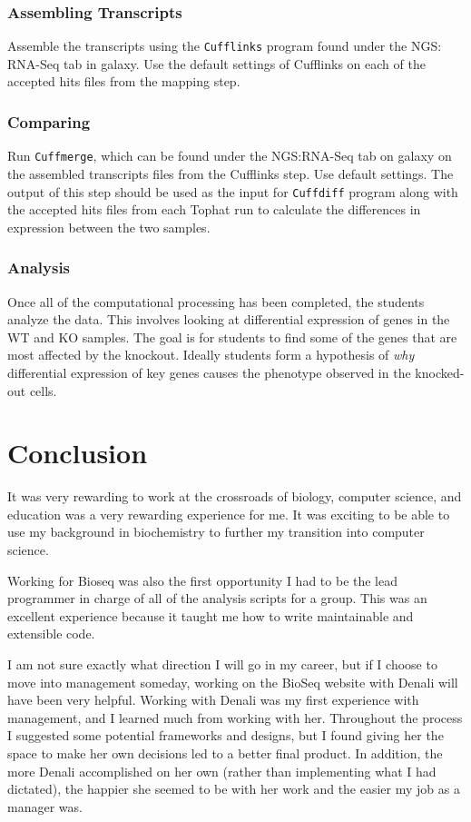 \documentclass{report}
\begin{document}
\subsection{Assembling Transcripts}
Assemble the transcripts using the \texttt{Cufflinks} program found under the NGS: RNA-Seq tab in galaxy. Use the default settings of Cufflinks on each of the accepted hits files from the mapping step.

\subsection{Comparing}
Run \texttt{Cuffmerge}, which can be found under the NGS:RNA-Seq tab on galaxy on the assembled transcripts files from the Cufflinks step. Use default settings. The output of this step should be used as the input for \texttt{Cuffdiff} program along with the accepted hits files from each Tophat run to calculate the differences in expression between the two samples. 

\subsection{Analysis}
Once all of the computational processing has been completed, the students analyze the data. This involves looking at differential expression of genes in the WT and KO samples. The goal is for students to find some of the genes that are most affected by the knockout. Ideally students form a hypothesis of \emph{why} differential expression of key genes causes the phenotype observed in the knocked-out cells.

\chapter{Conclusion}
It was very rewarding to work at the crossroads of biology, computer science, and education was a very rewarding experience for me. It was exciting to be able to use my background in biochemistry to further my transition into computer science.

Working for Bioseq was also the first opportunity I had to be the lead programmer in charge of all of the analysis scripts for a group. This was an excellent experience because it taught me how to write maintainable and extensible code.

I am not sure exactly what direction I will go in my career, but if I  choose to move into management someday, working on the BioSeq website with Denali will have been very helpful. Working with Denali was my first experience with management, and I learned much from working with her. Throughout the process I suggested some potential frameworks and designs, but I found giving her the space to make her own decisions led to a better final product. In addition, the more Denali accomplished on her own (rather than implementing what I had dictated), the happier she seemed to be with her work and the easier my job as a manager was.
\end{document}

